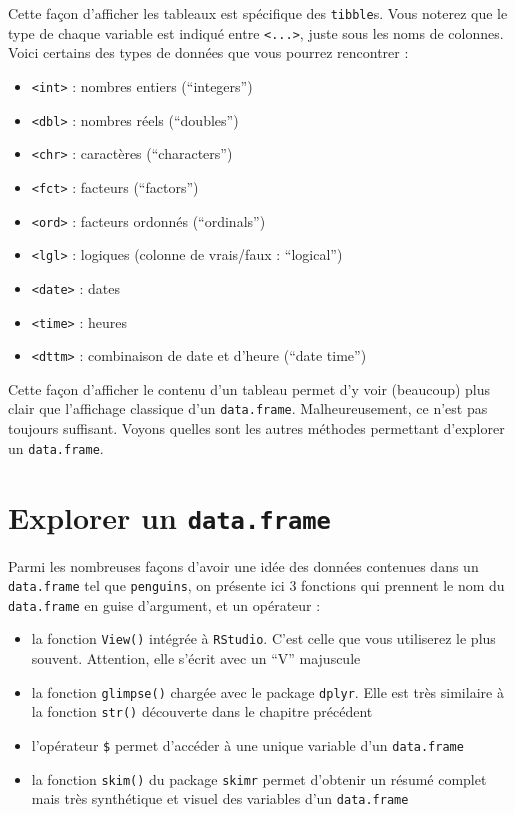 \documentclass[
  a4paper,
  DIV=11,
  numbers=noendperiod,
  oneside]{scrreprt}
\providecommand{\tightlist}{%
  \setlength{\itemsep}{0pt}\setlength{\parskip}{0pt}}\usepackage{longtable,booktabs,array}
\begin{document}
Cette façon d'afficher les tableaux est spécifique des \texttt{tibble}s.
Vous noterez que le type de chaque variable est indiqué entre
\texttt{\textless{}...\textgreater{}}, juste sous les noms de colonnes.
Voici certains des types de données que vous pourrez rencontrer :

\begin{itemize}
\tightlist
\item
  \texttt{\textless{}int\textgreater{}} : nombres entiers (``integers'')
\item
  \texttt{\textless{}dbl\textgreater{}} : nombres réels (``doubles'')
\item
  \texttt{\textless{}chr\textgreater{}} : caractères (``characters'')
\item
  \texttt{\textless{}fct\textgreater{}} : facteurs (``factors'')
\item
  \texttt{\textless{}ord\textgreater{}} : facteurs ordonnés
  (``ordinals'')
\item
  \texttt{\textless{}lgl\textgreater{}} : logiques (colonne de
  vrais/faux : ``logical'')
\item
  \texttt{\textless{}date\textgreater{}} : dates
\item
  \texttt{\textless{}time\textgreater{}} : heures
\item
  \texttt{\textless{}dttm\textgreater{}} : combinaison de date et
  d'heure (``date time'')
\end{itemize}

Cette façon d'afficher le contenu d'un tableau permet d'y voir
(beaucoup) plus clair que l'affichage classique d'un
\texttt{data.frame}. Malheureusement, ce n'est pas toujours suffisant.
Voyons quelles sont les autres méthodes permettant d'explorer un
\texttt{data.frame}.

\section{\texorpdfstring{Explorer un
\texttt{data.frame}}{Explorer un data.frame}}\label{explorer-un-data.frame}

Parmi les nombreuses façons d'avoir une idée des données contenues dans
un \texttt{data.frame} tel que \texttt{penguins}, on présente ici 3
fonctions qui prennent le nom du \texttt{data.frame} en guise
d'argument, et un opérateur :

\begin{itemize}
\tightlist
\item
  la fonction \texttt{View()} intégrée à \texttt{RStudio}. C'est celle
  que vous utiliserez le plus souvent. Attention, elle s'écrit avec un
  ``V'' majuscule
\item
  la fonction \texttt{glimpse()} chargée avec le package \texttt{dplyr}.
  Elle est très similaire à la fonction \texttt{str()} découverte dans
  le chapitre précédent
\item
  l'opérateur \texttt{\$} permet d'accéder à une unique variable d'un
  \texttt{data.frame}
\item
  la fonction \texttt{skim()} du package \texttt{skimr} permet d'obtenir
  un résumé complet mais très synthétique et visuel des variables d'un
  \texttt{data.frame}
\end{itemize}
\end{document}
